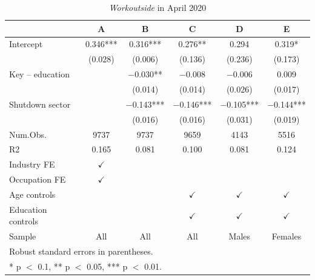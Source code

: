 \begin{table}
\centering
\caption{\textit{Workoutside} in April 2020}
\centering
\begin{tabular}[t]{lccccc}
\toprule
  & A & B & C & D & E\\
\midrule
Intercept & \num{0.346}*** & \num{0.316}*** & \num{0.276}** & \num{0.294} & \num{0.319}*\\
 & (\num{0.028}) & (\num{0.006}) & (\num{0.136}) & (\num{0.236}) & (\num{0.173})\\
Key – education &  & \num{-0.030}** & \num{-0.008} & \num{-0.006} & \num{0.009}\\
 &  & (\num{0.014}) & (\num{0.014}) & (\num{0.026}) & (\num{0.017})\\
Shutdown sector &  & \num{-0.143}*** & \num{-0.146}*** & \num{-0.105}*** & \num{-0.144}***\\
 &  & (\num{0.016}) & (\num{0.016}) & (\num{0.031}) & (\num{0.019})\\
\midrule
Num.Obs. & \num{9737} & \num{9737} & \num{9659} & \num{4143} & \num{5516}\\
R2 & \num{0.165} & \num{0.081} & \num{0.100} & \num{0.081} & \num{0.124}\\
Industry FE & $\checkmark$ &  &  &  & \\
Occupation FE & $\checkmark$ &  &  &  & \\
Age controls &  &  & $\checkmark$ & $\checkmark$ & $\checkmark$\\
Education controls &  &  & $\checkmark$ & $\checkmark$ & $\checkmark$\\
Sample & All & All & All & Males & Females\\
\bottomrule
\multicolumn{6}{l}{\rule{0pt}{1em}Robust standard errors in parentheses.}\\
\multicolumn{6}{l}{\rule{0pt}{1em}* p $<$ 0.1, ** p $<$ 0.05, *** p $<$ 0.01.}\\
\end{tabular}
\end{table}
